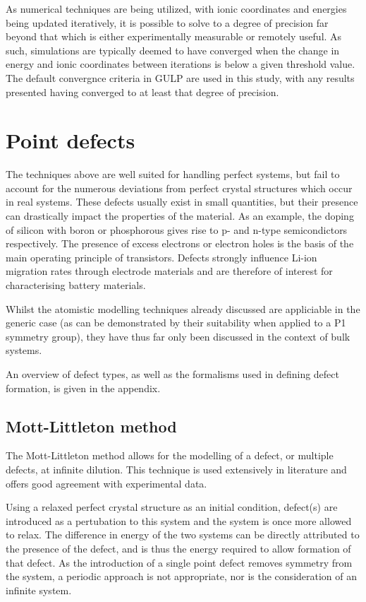 As numerical techniques are being utilized, with ionic coordinates and energies being updated iteratively, it is possible to solve to a degree of precision far beyond that which is either experimentally measurable or remotely useful.
As such, simulations are typically deemed to have converged when the change in energy and ionic coordinates between iterations is below a given threshold value.
The default convergnce criteria in GULP are used in this study, with any results presented having converged to at least that degree of precision.

\section{Point defects}
The techniques above are well suited for handling perfect systems, but fail to account for the numerous deviations from perfect crystal structures which occur in real systems.
These defects usually exist in small quantities, but their presence can drastically impact the properties of the material.
As an example, the doping of silicon with boron or phosphorous gives rise to p- and n-type semicondictors respectively.
The presence of excess electrons or electron holes is the basis of the main operating principle of transistors.
Defects strongly influence Li-ion migration rates through electrode materials and are therefore of interest for characterising battery materials.

Whilst the atomistic modelling techniques already discussed are appliciable in the generic case (as can be demonstrated by their suitability when applied to a P1 symmetry group), they have thus far only been discussed in the context of bulk systems.

An overview of defect types, as well as the formalisms used in defining defect formation, is given in the appendix.

\subsection{Mott-Littleton method}
The Mott-Littleton method allows for the modelling of a defect, or multiple defects, at infinite dilution.
This technique is used extensively in literature\cite{Fisher2008} and offers good agreement with experimental data.

Using a relaxed perfect crystal structure as an initial condition, defect(s) are introduced as a pertubation to this system and the system is once more allowed to relax.
The difference in energy of the two systems can be directly attributed to the presence of the defect, and is thus the energy required to allow formation of that defect.
As the introduction of a single point defect removes symmetry from the system, a periodic approach is not appropriate, nor is the consideration of an infinite system.

